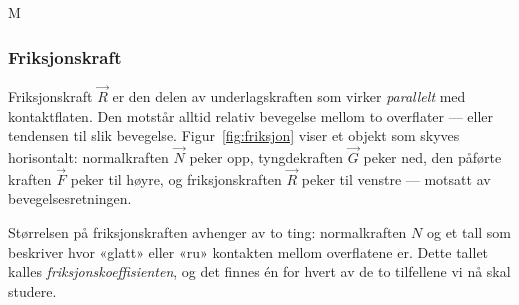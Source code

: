 M

\subsubsection{Friksjonskraft}

\noindent
\begin{minipage}[t]{0.54\linewidth}
\vspace{0pt}
Friksjonskraft $\vec{R}$ er den delen av underlagskraften som virker \textit{parallelt} med kontaktflaten. Den motstår alltid relativ bevegelse mellom to overflater — eller tendensen til slik bevegelse. Figur~\ref{fig:friksjon} viser et objekt som skyves horisontalt: normalkraften $\vec{N}$ peker opp, tyngdekraften $\vec{G}$ peker ned, den påførte kraften $\vec{F}$ peker til høyre, og friksjonskraften $\vec{R}$ peker til venstre — motsatt av bevegelsesretningen.

Størrelsen på friksjonskraften avhenger av to ting: normalkraften $N$ og et tall som beskriver hvor «glatt» eller «ru» kontakten mellom overflatene er. Dette tallet kalles \textit{friksjonskoeffisienten}, og det finnes én for hvert av de to tilfellene vi nå skal studere.
\end{minipage}%
\hfill
